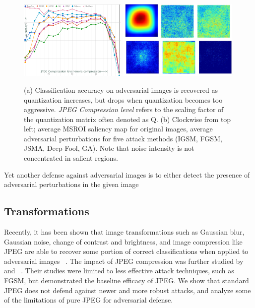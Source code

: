 \begin{figure}[H]
    \centering
     \includegraphics[width=0.46\textwidth,angle=0]{figures/protect/jpeg_study.png}
     \includegraphics[width=0.52\textwidth,angle=0]{figures/protect/drawing_noise.jpg}
     \label{fig:jpeg}
     \caption[JPEG under attack]{(a) Classification accuracy on adversarial images is recovered as quantization increases, but drops when quantization becomes too aggressive. \textit{JPEG Compression level} refers to the scaling factor of the quantization matrix often denoted as Q. (b) Clockwise from top left; average MSROI saliency map for original images, average adversarial perturbations for five attack methods (IGSM, FGSM, JSMA, Deep Fool, GA).  Note that noise intensity is not concentrated in salient regions.}
 \end{figure}
Yet another defense against adversarial images is to either detect the presence of adversarial perturbations in the given image

\subsection{Transformations}

Recently, it has been shown that image transformations such as Gaussian blur, Gaussian noise, change of contrast and brightness, and image compression like JPEG are able to recover some portion of correct classifications when applied to adversarial images ~\cite{Kurakin2016AdversarialEI}.
The impact of JPEG compression was further studied by ~\cite{Dziugaite2016ASO} and ~\cite{Das2017KeepingTB}.
Their studies were limited to less effective attack techniques, such as FGSM, but demonstrated the baseline efficacy of JPEG. 
We show that standard JPEG does not defend against newer and more robust attacks, and analyze some of the limitations of pure JPEG for adversarial defense.

